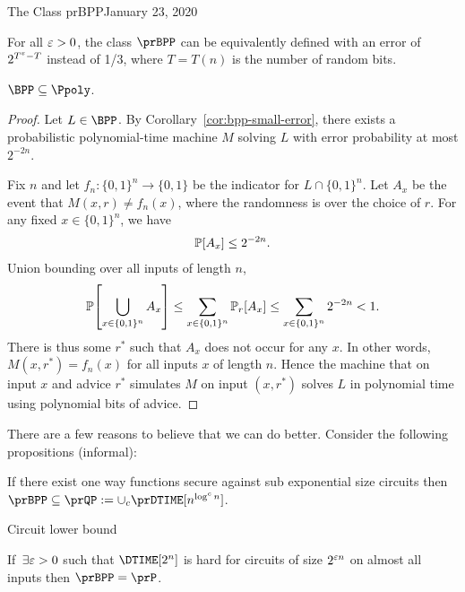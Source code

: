 \begin{lecture}{1}{The Class prBPP}{January 23, 2020}
\begin{corollary}\label{cor:bpp-small-random}
  For all $\varepsilon > 0$, the class $\prBPP$ can be equivalently defined with an
  error of $2^{T^\varepsilon - T}$ instead of 1/3, where $T = T(n)$ is the number of
  random bits.
\end{corollary}


\begin{corollary}
  $\BPP \subseteq \Ppoly$.
\end{corollary}

\begin{proof}
    Let $L \in \BPP$. By Corollary~\ref{cor:bpp-small-error}, there exists a
    probabilistic polynomial-time machine $M$ solving $L$ with error
    probability at most $2^{-2n}$.

    Fix $n$ and let $f_n : \{0, 1\}^n \to \{0, 1\}$ be the indicator for $L
    \cap \{0, 1\}^n$. Let $A_x$ be the event that $M(x, r) \ne f_n(x)$, where
    the randomness is over the choice of $r$. For any fixed $x \in \{0, 1\}^n$,
    we have
    \begin{align*}
      \Pr\brac*{A_x} \leq 2^{-2n}.
    \end{align*}
    Union bounding over all inputs of length $n$, \[
      \Pr\brac*{\bigcup_{x \in \set{0, 1}^n} A_x}
      \leq \sum_{x \in \set{0,1}^n} \Pr_r\brac*{A_x}
      \leq \sum_{x \in \set{0,1}^n} 2^{-2n}
      < 1.
    \]
    There is thus some $r^*$ such that $A_x$ does not occur for any $x$. In
    other words, $M(x,r^*) = f_n(x)$ for all inputs $x$ of length $n$. Hence the
    machine that on input $x$ and advice $r^*$ simulates $M$ on input $(x,
    r^*)$ solves $L$ in polynomial time using polynomial bits of advice.
\end{proof}

There are a few reasons to believe that we can do better. Consider the following propositions (informal):

\begin{proposition}[BM82,GGM84]
	If there exist one way functions secure against sub exponential size circuits then $\prBPP \subseteq \prQP := \cup_c \prDTIME[n^{\log^c n}]$.
\end{proposition}

Circuit lower bound
\begin{proposition}[IW97]
	If $\,\exists \varepsilon>0$ such that $\DTIME[2^n]$ is hard for circuits of size $2^{\varepsilon n}$ on almost all inputs then $\prBPP=\prP$.
\end{proposition}


\end{lecture}
